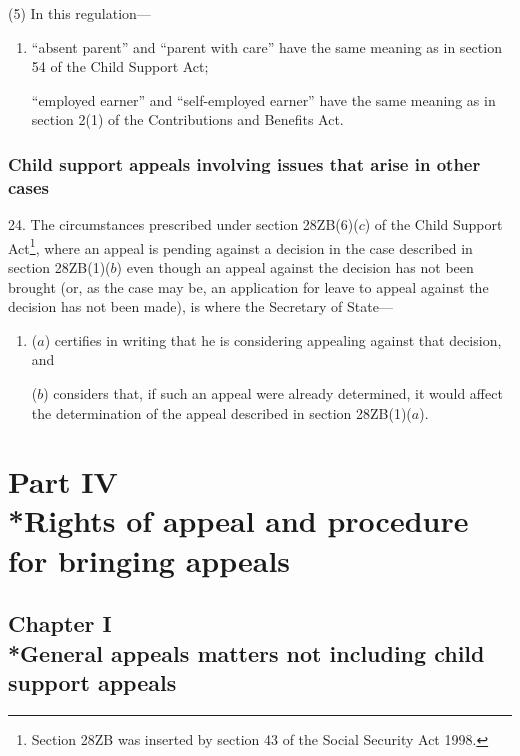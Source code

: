 \documentclass[12pt,a4paper]{article}
\begin{document}
(5) In this regulation—
\begin{enumerate}\item[]
“absent parent” and “parent with care” have the same meaning as in section 54 of the Child Support Act;

“employed earner” and “self-employed earner” have the same meaning as in section 2(1) of the Contributions and Benefits Act.
\end{enumerate}

\subsubsection[24. Child support appeals involving issues that arise in other cases]{Child support appeals involving issues that arise in other cases}

24.  The circumstances prescribed under section 28ZB(6)($c$) of the Child Support Act\footnote{\frenchspacing Section 28ZB was inserted by section 43 of the Social Security Act 1998.}, where an appeal is pending against a decision in the case described in section 28ZB(1)($b$) even though an appeal against the decision has not been brought (or, as the case may be, an application for leave to appeal against the decision has not been made), is where the Secretary of State—
\begin{enumerate}\item[]
($a$) certifies in writing that he is considering appealing against that decision, and

($b$) considers that, if such an appeal were already determined, it would affect the determination of the appeal described in section 28ZB(1)($a$).
\end{enumerate}

\section[Part IV --- Rights of appeal and procedure for bringing appeals]{Part IV\\*Rights of appeal and procedure for bringing appeals}

\subsection[Chapter I --- General appeals matters not including child support appeals]{Chapter I\\*General appeals matters not including child support appeals}

\renewcommand\parthead{--- Part IV Chapter I}
\end{document}
